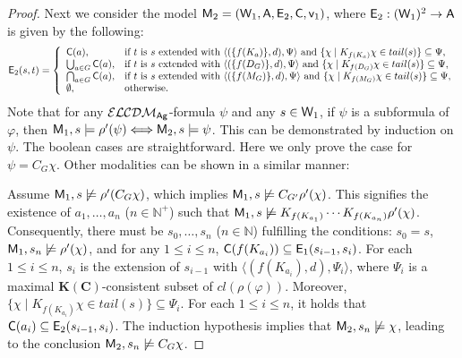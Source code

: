 \documentclass{article}
\newcommand{\ag}{\text{\normalfont\textsf{Ag}}\xspace}
\newcommand{\CA}{\textnormal{\sf A}\xspace}
\newcommand{\CC}{\textnormal{\sf C}\xspace}
\newcommand{\CE}{\textnormal{\sf E}\xspace}
\newcommand{\CM}{\textnormal{\sf M}\xspace}
\newcommand{\CV}{\textnormal{\sf v}\xspace}
\newcommand{\CW}{\textnormal{\sf W}\xspace}
\renewcommand{\phi}{\varphi}
\newcommand{\mbN}{\mathbb{N}}
\newcommand{\langcdm}{\ensuremath{\mathcal{ELCDM}}\xspace}
\newcommand{\KC}{\ensuremath{\mathbf{K(C)}}\xspace}
\begin{document}
\begin{proof}
Next we consider the model $\CM_2=(\CW_1,\CA,\CE_2,\CC,\CV_1)$, where $\CE_2:(\CW_1)^2 \to \CA$ is given by the following:
$$\CE_2(s,t)  = \left\{\begin{array}{ll}
	\CC(a), & \text{if $t$ is $s$ extended with $\langle (\{f(K_a)\},d), \Psi \rangle$ and $\{\chi\mid K_{f(K_a)}\chi \in tail(s)\}  \subseteq \Psi$},\\
	\bigcup_{a\in G} \CC(a), & \text{if $t$ is $s$ extended with $\langle (\{f(D_G)\},d), \Psi \rangle$ and $\{\chi\mid K_{f(D_G)}\chi \in tail(s)\}  \subseteq \Psi$},\\
	\bigcap_{a\in G} \CC(a), & \text{if $t$ is $s$ extended with $\langle (\{f(M_G)\},d), \Psi \rangle$ and $\{\chi\mid K_{f(M_G)}\chi \in tail(s)\}  \subseteq \Psi$},\\
	\emptyset, & \text{otherwise}.
\end{array}\right.$$
Note that for any $\langcdm_{\ag}$-formula $\psi$ and any $s\in\CW_1$, if $\psi$ is a subformula of $\phi$, then $\CM_1,s \models \rho'(\psi) \Longleftrightarrow \CM_2,s\models \psi$. This can be demonstrated by induction on $\psi$. The boolean cases are straightforward. Here we only prove the case for $\psi = C_G \chi$. Other modalities can be shown in a similar manner:

Assume $\CM_1,s\not\models \rho'(C_G\chi)$, which implies $\CM_1,s\not\models C_{G'}\rho'(\chi)$. This signifies the existence of $a_1,\dots,a_n$ ($n\in\mbN^+$) such that $\CM_1,s\not\models K_{f(K_{a_1})}\cdots K_{f(K_{a_n})}\rho'(\chi)$. Consequently, there must be $s_0,\dots,s_n$ ($n\in\mbN$) fulfilling the conditions: $s_0=s$, $\CM_1,s_n\not\models \rho'(\chi)$, and for any $1\leq i\leq n$, $\CC(f(K_{a_i}))\subseteq \CE_1(s_{i-1},s_i)$. For each $1\leq i\leq n$, $s_i$ is the extension of $s_{i-1}$ with $\langle ({f(K_{a_i})},d), \Psi_i \rangle$, where $\Psi_i$ is a maximal \KC-consistent subset of $cl(\rho(\phi))$. Moreover, $\{\chi\mid K_{f(K_{a_i})}\chi \in tail(s) \} \subseteq \Psi_i$. For each $1\leq i\leq n$, it holds that $\CC(a_i)\subseteq \CE_2(s_{i-1},s_i)$. The induction hypothesis implies that $\CM_2,s_n\not\models \chi$, leading to the conclusion $\CM_2,s_n\not\models C_G\chi$.


\end{proof}
\end{document}
